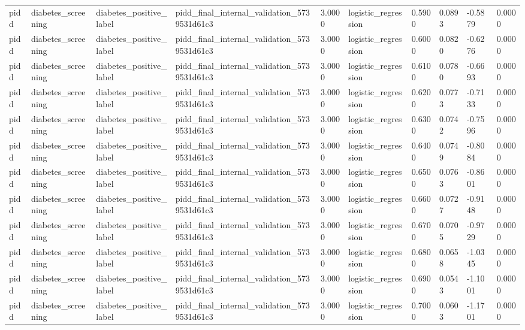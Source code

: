 \begin{tabular}{llllllllll}
pidd & diabetes\_screening & diabetes\_positive\_label & pidd\_final\_internal\_validation\_5739531d61c3 & 3.0000 & logistic\_regression & 0.5900 & 0.0893 & -0.5879 & 0.0000 \\
pidd & diabetes\_screening & diabetes\_positive\_label & pidd\_final\_internal\_validation\_5739531d61c3 & 3.0000 & logistic\_regression & 0.6000 & 0.0820 & -0.6276 & 0.0000 \\
pidd & diabetes\_screening & diabetes\_positive\_label & pidd\_final\_internal\_validation\_5739531d61c3 & 3.0000 & logistic\_regression & 0.6100 & 0.0780 & -0.6693 & 0.0000 \\
pidd & diabetes\_screening & diabetes\_positive\_label & pidd\_final\_internal\_validation\_5739531d61c3 & 3.0000 & logistic\_regression & 0.6200 & 0.0773 & -0.7133 & 0.0000 \\
pidd & diabetes\_screening & diabetes\_positive\_label & pidd\_final\_internal\_validation\_5739531d61c3 & 3.0000 & logistic\_regression & 0.6300 & 0.0742 & -0.7596 & 0.0000 \\
pidd & diabetes\_screening & diabetes\_positive\_label & pidd\_final\_internal\_validation\_5739531d61c3 & 3.0000 & logistic\_regression & 0.6400 & 0.0749 & -0.8084 & 0.0000 \\
pidd & diabetes\_screening & diabetes\_positive\_label & pidd\_final\_internal\_validation\_5739531d61c3 & 3.0000 & logistic\_regression & 0.6500 & 0.0763 & -0.8601 & 0.0000 \\
pidd & diabetes\_screening & diabetes\_positive\_label & pidd\_final\_internal\_validation\_5739531d61c3 & 3.0000 & logistic\_regression & 0.6600 & 0.0727 & -0.9148 & 0.0000 \\
pidd & diabetes\_screening & diabetes\_positive\_label & pidd\_final\_internal\_validation\_5739531d61c3 & 3.0000 & logistic\_regression & 0.6700 & 0.0705 & -0.9729 & 0.0000 \\
pidd & diabetes\_screening & diabetes\_positive\_label & pidd\_final\_internal\_validation\_5739531d61c3 & 3.0000 & logistic\_regression & 0.6800 & 0.0658 & -1.0345 & 0.0000 \\
pidd & diabetes\_screening & diabetes\_positive\_label & pidd\_final\_internal\_validation\_5739531d61c3 & 3.0000 & logistic\_regression & 0.6900 & 0.0543 & -1.1001 & 0.0000 \\
pidd & diabetes\_screening & diabetes\_positive\_label & pidd\_final\_internal\_validation\_5739531d61c3 & 3.0000 & logistic\_regression & 0.7000 & 0.0603 & -1.1701 & 0.0000 \\

\end{tabular}
